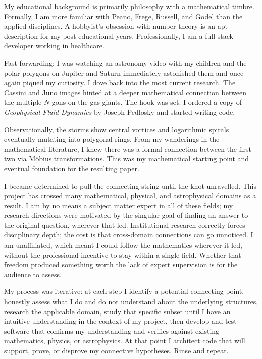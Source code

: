 \documentclass[12pt, a4paper]{article}
\numberwithin{equation}{section}
\begin{document}
My educational background is primarily philosophy with a mathematical
timbre.  Formally, I am more familiar with Peano, Frege, Russell, and
G\"odel than the applied disciplines.  A hobbyist's obsession with
number theory is an apt description for my post-educational years.
Professionally, I am a full-stack developer working in healthcare.

Fast-forwarding: I was watching an astronomy video with my children and
the polar polygons on Jupiter and Saturn immediately astonished them
and once again piqued my curiosity.  I dove back into the most current
research.  The Cassini and Juno images hinted at a deeper mathematical
connection between the multiple $N$-gons on the gas giants.  The hook
was set.  I ordered a copy of \emph{Geophysical Fluid Dynamics} by
Joseph Pedlosky and started writing code.

Observationally, the storms show central vortices and logarithmic
spirals eventually mutating into polygonal rings.  From my wanderings
in the mathematical literature, I knew there was a formal connection
between the first two via M\"obius transformations.  This was my
mathematical starting point and eventual foundation for the resulting
paper.

I became determined to pull the connecting string until the knot
unravelled.  This project has crossed many mathematical, physical,
and astrophysical domains as a result.  I am by no means a subject
matter expert in all of these fields; my research directions were
motivated by the singular goal of finding an answer to the original
question, wherever that led.  Institutional research correctly forces
disciplinary depth; the cost is that cross-domain connections can go
unnoticed.  I am unaffiliated, which meant I could follow the
mathematics wherever it led, without the professional incentive to
stay within a single field.  Whether that freedom produced something
worth the lack of expert supervision is for the audience to assess.

My process was iterative: at each step I identify a potential connecting
point, honestly assess what I do and do not understand about the
underlying structures, research the applicable domain, study that
specific subset until I have an intuitive understanding in the context
of my project, then develop and test software that confirms my
understanding and verifies against existing mathematics, physics, or
astrophysics.  At that point I architect code that will support, prove,
or disprove my connective hypotheses.  Rinse and repeat.
\end{document}
